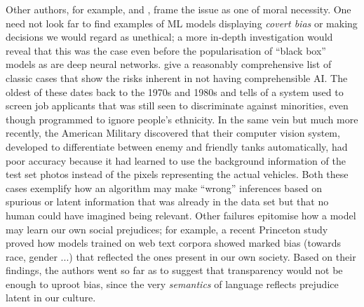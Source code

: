 Other authors, for example, \citet{doshi2017towards} and \citet{guidotti2018survey}, frame the issue as one of moral necessity.
One need not look far to find examples of ML models displaying \textit{covert bias} or making decisions we would regard as unethical; a more in-depth investigation would reveal that this was the case even before the popularisation of \enquote{black box} models as are deep neural networks.
\citet{guidotti2018survey} give a reasonably comprehensive list of classic cases that show the risks inherent in not having comprehensible AI.
The oldest of these dates back to the 1970s and 1980s and tells of a system used to screen job applicants that was still seen to discriminate against minorities, even though programmed to ignore people's ethnicity.
In the same vein but much more recently, the American Military discovered that their computer vision system, developed to differentiate between enemy and friendly tanks automatically, had poor accuracy because it had learned to use the background information of the test set photos instead of the pixels representing the actual vehicles.
Both these cases exemplify how an algorithm may make \enquote{wrong} inferences based on spurious or latent information that was already in the data set but that no human could have imagined being relevant.
Other failures epitomise how a model may learn our own social prejudices; for example, a recent Princeton study \citep{caliskan2017semantics} proved how models trained on web text corpora showed marked bias (towards race, gender ...) that reflected the ones present in our own society.
Based on their findings, the authors went so far as to suggest that transparency would not be enough to uproot bias, since the very \textit{semantics} of language reflects prejudice latent in our culture. 

